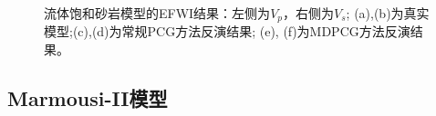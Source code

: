 \begin{figure}[!htb]
\begin{center}
        \caption{
			流体饱和砂岩模型的EFWI结果：左侧为$V_p$，右侧为$V_s$;
			(a),(b)为真实模型;(c),(d)为常规PCG方法反演结果; (e), (f)为MDPCG方法反演结果。
    }
    \label{fig:smallmodel}
    \end{center}
\end{figure}
\subsection{Marmousi-II模型}
